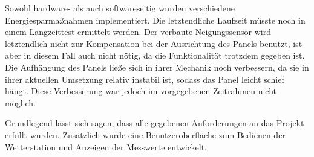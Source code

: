 Sowohl hardware- als auch softwareseitig wurden verschiedene Energiesparmaßnahmen implementiert. Die letztendliche Laufzeit müsste noch in einem Langzeittest ermittelt werden. Der verbaute Neigungssensor wird letztendlich nicht zur Kompensation bei der Ausrichtung des Panels benutzt, ist aber in diesem Fall auch nicht nötig, da die Funktionalität trotzdem gegeben ist. Die Aufhängung des Panels ließe sich in ihrer Mechanik noch verbessern, da sie in ihrer aktuellen Umsetzung relativ instabil ist, sodass das Panel leicht schief hängt. Diese Verbesserung war jedoch im vorgegebenen Zeitrahmen nicht möglich.

Grundlegend lässt sich sagen, dass alle gegebenen Anforderungen an das Projekt erfüllt wurden. Zusätzlich wurde eine Benutzeroberfläche zum Bedienen der Wetterstation und Anzeigen der Messwerte entwickelt.



